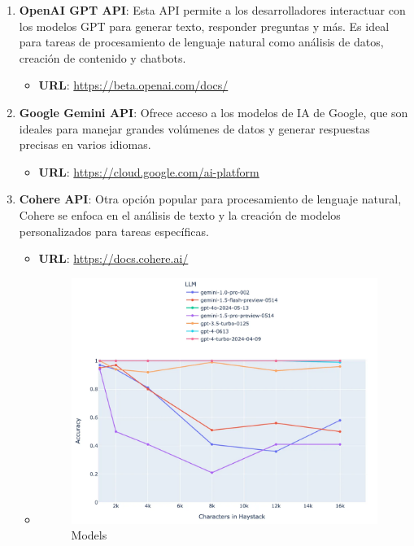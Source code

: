 \documentclass[
  10pt,
  letterpaper,
]{book}
\providecommand{\tightlist}{%
  \setlength{\itemsep}{0pt}\setlength{\parskip}{0pt}}\usepackage{longtable,booktabs,array}
\begin{document}
\begin{enumerate}
\def\labelenumi{\arabic{enumi}.}
\tightlist
\item
  \textbf{OpenAI GPT API}: Esta API permite a los desarrolladores
  interactuar con los modelos GPT para generar texto, responder
  preguntas y más. Es ideal para tareas de procesamiento de lenguaje
  natural como análisis de datos, creación de contenido y chatbots.

  \begin{itemize}
  \tightlist
  \item
    \textbf{URL}: \url{https://beta.openai.com/docs/}
  \end{itemize}
\item
  \textbf{Google Gemini API}: Ofrece acceso a los modelos de IA de
  Google, que son ideales para manejar grandes volúmenes de datos y
  generar respuestas precisas en varios idiomas.

  \begin{itemize}
  \tightlist
  \item
    \textbf{URL}: \url{https://cloud.google.com/ai-platform}
  \end{itemize}
\item
  \textbf{Cohere API}: Otra opción popular para procesamiento de
  lenguaje natural, Cohere se enfoca en el análisis de texto y la
  creación de modelos personalizados para tareas específicas.

  \begin{itemize}
  \item
    \textbf{URL}: \url{https://docs.cohere.ai/}
  \item
    \begin{figure}[H]

    {\centering \includegraphics{Img/models.png}

    }

    \caption{Models}

    \end{figure}%
  \end{itemize}
\end{enumerate}
\end{document}
